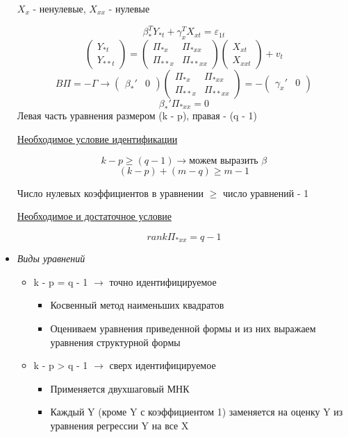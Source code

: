 \documentclass[a4paper, 12pt]{article}
\begin{document}
\begin{itemize}
    $X_{x}$ - ненулевые, $X_{xx}$ - нулевые
    
    \[\beta^{T}_{*}Y_{*t} + \gamma_{x}^{T}X_{xt} = \varepsilon_{1t}\]
    \[\begin{pmatrix}Y_{*t} \\ Y_{**t}\end{pmatrix} = \begin{pmatrix}\Pi_{*x} & \Pi_{*xx} \\ \Pi_{**x} & \Pi_{**xx}\end{pmatrix} \begin{pmatrix}X_{xt} \\ X_{xxt}\end{pmatrix} + v_{t}\]
    \[B\Pi = - \Gamma \rightarrow \begin{pmatrix} \beta_{*}' & 0 \end{pmatrix}\begin{pmatrix}\Pi_{*x} & \Pi_{*xx} \\ \Pi_{**x} & \Pi_{**xx}\end{pmatrix} = - \begin{pmatrix} \gamma_{x}' & 0 \end{pmatrix}\]
    \[\beta_{*}'\Pi_{*xx} = 0\]
    Левая часть уравнения размером (k - p), правая - (q - 1)
    
    \begin{center}
        \underline{Необходимое условие идентификации}
    \end{center}
    \[k - p \geq (q - 1) \rightarrow \textrm{можем выразить $\beta$}\] 
    \[(k - p) + (m - q) \geq m - 1\]
    
    \begin{center}
        Число нулевых коэффициентов в уравнении $\geq$ число уравнений - 1
    \end{center}
    
    \begin{center}
        \underline{Необходимое и достаточное условие}
    \end{center}
    \[rank\Pi_{*xx} = q - 1\]
    \item \textit{Виды уравнений}
    \begin{itemize}
        \item k - p = q - 1 $\rightarrow$ точно идентифицируемое
        \begin{itemize}
            \item Косвенный метод наименьших квадратов
            \item Оцениваем уравнения приведенной формы и из них выражаем уравнения структурной формы
        \end{itemize}
        \item k - p > q - 1 $\rightarrow$ сверх идентифицируемое
        \begin{itemize}
            \item Применяется двухшаговый МНК
            \item Каждый Y (кроме Y с коэффициентом 1) заменяется на оценку Y из уравнения регрессии Y на все X
        \end{itemize}
    \end{itemize}
\end{itemize}
\end{document}
